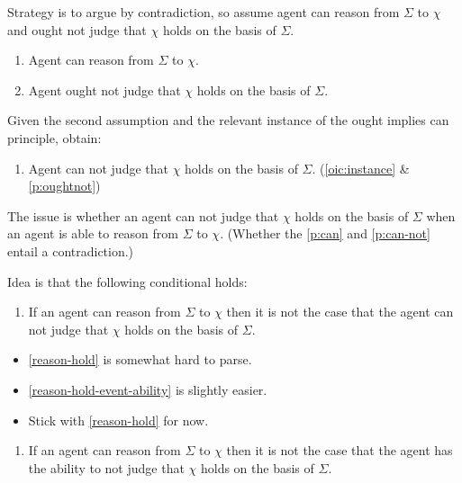 \documentclass[10pt]{article}
\newcommand{\hozlinedash}[0]{%
  \noindent\hdashrule[0.5ex][c]{\textwidth}{.1pt}{2.5pt}
}
\begin{document}
Strategy is to argue by contradiction, so assume agent can reason from \(\Sigma\) to \(\chi\) and ought not judge that \(\chi\) holds on the basis of \(\Sigma\).

\begin{enumerate}[label=P\arabic*., ref=P\arabic*, resume]
\item\label{p:can} Agent can reason from \(\Sigma\) to \(\chi\).
\item\label{p:oughtnot} Agent ought not judge that \(\chi\) holds on the basis of \(\Sigma\).
\end{enumerate}

Given the second assumption and the relevant instance of the ought implies can principle, obtain:

\begin{enumerate}[label=P\arabic*., ref=P\arabic*, resume]
\item\label{p:can-not} Agent can not judge that \(\chi\) holds on the basis of \(\Sigma\). \hfill (\ref{oic:instance} \& \ref{p:oughtnot})
\end{enumerate}

The issue is whether an agent can not judge that \(\chi\) holds on the basis of \(\Sigma\) when an agent is able to reason from \(\Sigma\) to \(\chi\).
(Whether the \ref{p:can} and \ref{p:can-not} entail a contradiction.)

\hozlinedash


Idea is that the following conditional holds:

\begin{enumerate}[label=H\arabic*., ref=H\arabic*]
\item\label{reason-hold} If an agent can reason from \(\Sigma\) to \(\chi\) then it is not the case that the agent can not judge that \(\chi\) holds on the basis of \(\Sigma\).
\end{enumerate}

\begin{itemize}
\item \ref{reason-hold} is somewhat hard to parse.
\item \ref{reason-hold-event-ability} is slightly easier.
\item Stick with \ref{reason-hold} for now.
\end{itemize}

\begin{enumerate}[label=H\arabic*\('\)., ref=H\arabic*\('\)]
\item\label{reason-hold-event-ability} If an agent can reason from \(\Sigma\) to \(\chi\) then it is not the case that the agent has the ability to not judge that \(\chi\) holds on the basis of \(\Sigma\).
\end{enumerate}
\end{document}

